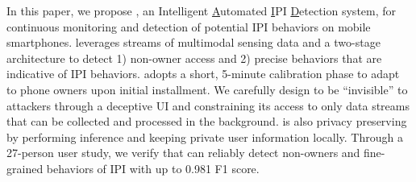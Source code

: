 In this paper, we propose \sys, an Intelligent \underline{A}utomated \underline{I}PI \underline{D}etection system, for continuous monitoring and detection of potential IPI behaviors on mobile smartphones. \sys leverages streams of multimodal sensing data and a two-stage architecture to detect 1) non-owner access and 2) precise behaviors that are indicative of IPI behaviors. \sys adopts a short, 5-minute calibration phase to adapt to phone owners upon initial installment. We carefully design \sys to be ``invisible'' to attackers through a deceptive UI and constraining its access to only data streams that can be collected and processed in the background. \sys is also privacy preserving by performing inference and keeping private user information locally. Through a 27-person user study, we verify that \sys can reliably detect non-owners and fine-grained behaviors of IPI with up to 0.981 F1 score.














